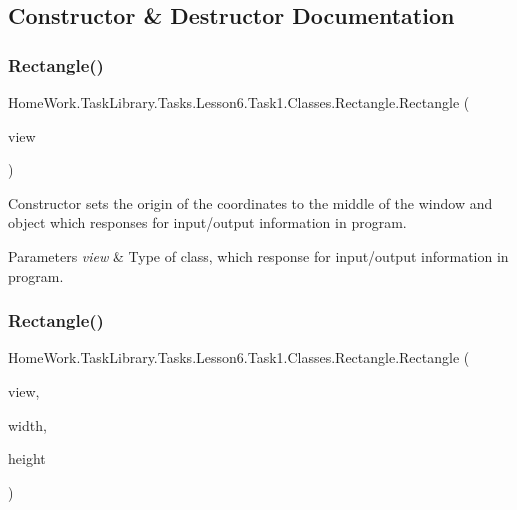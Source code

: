 \subsection{Constructor \& Destructor Documentation}
\mbox{\label{class_home_work_1_1_task_library_1_1_tasks_1_1_lesson6_1_1_task1_1_1_classes_1_1_rectangle_acda8d79357e5d833876045c9c42ec413}} 
\subsubsection{\texorpdfstring{Rectangle()}{Rectangle()}\hspace{0.1cm}{\footnotesize\ttfamily [1/3]}}
{\footnotesize\ttfamily Home\+Work.\+Task\+Library.\+Tasks.\+Lesson6.\+Task1.\+Classes.\+Rectangle.\+Rectangle (\begin{DoxyParamCaption}\item[{I\+Information}]{view }\end{DoxyParamCaption})}



Constructor sets the origin of the coordinates to the middle of the window and object which responses for input/output information in program. 


\begin{DoxyParams}{Parameters}
{\em view} & Type of class, which response for input/output information in program.\\
\hline
\end{DoxyParams}
\mbox{\label{class_home_work_1_1_task_library_1_1_tasks_1_1_lesson6_1_1_task1_1_1_classes_1_1_rectangle_a5ac93eca63cd4ab6f1736eaf4c6157b4}} 
\subsubsection{\texorpdfstring{Rectangle()}{Rectangle()}\hspace{0.1cm}{\footnotesize\ttfamily [2/3]}}
{\footnotesize\ttfamily Home\+Work.\+Task\+Library.\+Tasks.\+Lesson6.\+Task1.\+Classes.\+Rectangle.\+Rectangle (\begin{DoxyParamCaption}\item[{I\+Information}]{view,  }\item[{int}]{width,  }\item[{int}]{height }\end{DoxyParamCaption})}



